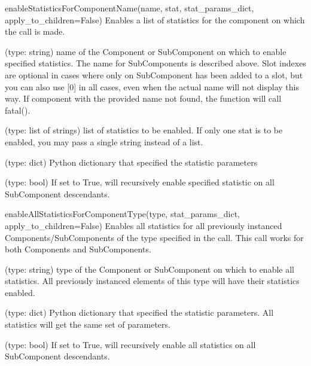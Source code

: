\begin{functiondoc}{enableStatisticsForComponentName(name, stat, stat_params_dict, apply_to_children=False)}{
  Enables a list of statistics for the component on which the call is
  made.
}

   (type: string) name of the Component or SubComponent on
  which to enable specified statistics.  The name for SubComponents is
  described above.  Slot indexes are optional in cases where only on
  SubComponent has been added to a slot, but you can also use [0] in
  all cases, even when the actual name will not display this way. If
  component with the provided name not found, the function will call
  fatal().

   (type: list of strings) list of statistics to be
  enabled.  If only one stat is to be enabled, you may pass a single
  string instead of a list.

   (type: dict) Python dictionary that
  specified the statistic parameters

   (type: bool) If set to True, will
  recursively enable specified statistic on all SubComponent
  descendants.

  \noreturn
\end{functiondoc}


\begin{functiondoc}{enableAllStatisticsForComponentType(type, stat_params_dict, apply_to_children=False)}{
    Enables all statistics for all previously instanced
    Components/SubComponents of the type specified in the call.  This
    call works for both Components and SubComponents.
  }
  
   (type: string) type of the Component or SubComponent on
  which to enable all statistics.  All previously instanced elements
  of this type will have their statistics enabled.

   (type: dict) Python dictionary that
  specified the statistic parameters.  All statistics will get the
  same set of parameters.

   (type: bool) If set to True, will
  recursively enable all statistics on all SubComponent descendants.

  \noreturn
\end{functiondoc}


